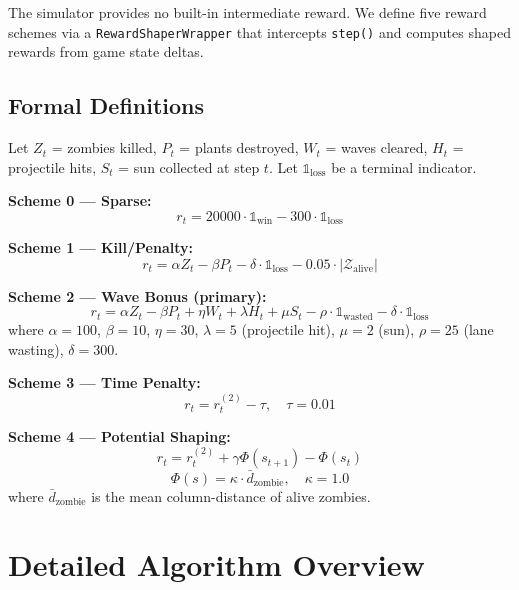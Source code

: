 \documentclass[conference]{IEEEtran}
\begin{document}
The simulator provides no built-in intermediate reward. We define five reward schemes via a \texttt{RewardShaperWrapper} that intercepts \texttt{step()} and computes shaped rewards from game state deltas.

\subsection{Formal Definitions}
Let $Z_t$ = zombies killed, $P_t$ = plants destroyed, $W_t$ = waves cleared, $H_t$ = projectile hits, $S_t$ = sun collected at step $t$. Let $\mathbb{1}_{\text{loss}}$ be a terminal indicator.

\textbf{Scheme 0 --- Sparse:}
\begin{equation}
r_t = 20000 \cdot \mathbb{1}_{\text{win}} - 300 \cdot \mathbb{1}_{\text{loss}}
\end{equation}

\textbf{Scheme 1 --- Kill/Penalty:}
\begin{equation}
r_t = \alpha Z_t - \beta P_t - \delta \cdot \mathbb{1}_{\text{loss}} - 0.05 \cdot |\mathcal{Z}_{\text{alive}}|
\end{equation}

\textbf{Scheme 2 --- Wave Bonus (primary):}
\begin{equation}
r_t = \alpha Z_t - \beta P_t + \eta W_t + \lambda H_t + \mu S_t - \rho \cdot \mathbb{1}_{\text{wasted}} - \delta \cdot \mathbb{1}_{\text{loss}}
\end{equation}
where $\alpha{=}100$, $\beta{=}10$, $\eta{=}30$, $\lambda{=}5$ (projectile hit), $\mu{=}2$ (sun), $\rho{=}25$ (lane wasting), $\delta{=}300$.

\textbf{Scheme 3 --- Time Penalty:}
\begin{equation}
r_t = r_t^{(2)} - \tau, \quad \tau = 0.01
\end{equation}

\textbf{Scheme 4 --- Potential Shaping:}
\begin{equation}
r_t = r_t^{(2)} + \gamma\Phi(s_{t+1}) - \Phi(s_t)
\end{equation}
\begin{equation}
\Phi(s) = \kappa \cdot \bar{d}_{\text{zombie}}, \quad \kappa=1.0
\end{equation}
where $\bar{d}_{\text{zombie}}$ is the mean column-distance of alive zombies. 

\section{Detailed Algorithm Overview}
\end{document}
